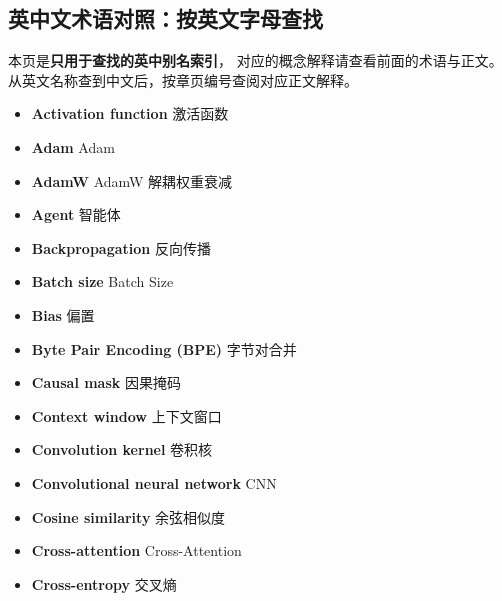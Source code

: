\subsection{英中文术语对照：按英文字母查找}

本页是\textbf{只用于查找的英中别名索引}，
对应的概念解释请查看前面的术语与正文。
从英文名称查到中文后，按章页编号查阅对应正文解释。

\small
\begin{itemize}[leftmargin=1.2em,itemsep=2pt,topsep=3pt]
\item {\sffamily\bfseries Activation function} \quad 激活函数\quad {}
\item {\sffamily\bfseries Adam} \quad Adam\quad {}
\item {\sffamily\bfseries AdamW} \quad AdamW 解耦权重衰减\quad {}
\item {\sffamily\bfseries Agent} \quad 智能体\quad {}
\item {\sffamily\bfseries Backpropagation} \quad 反向传播\quad {}
\item {\sffamily\bfseries Batch size} \quad Batch Size\quad {}
\item {\sffamily\bfseries Bias} \quad 偏置\quad {}
\item {\sffamily\bfseries Byte Pair Encoding (BPE)} \quad 字节对合并\quad {}
\item {\sffamily\bfseries Causal mask} \quad 因果掩码\quad {}
\item {\sffamily\bfseries Context window} \quad 上下文窗口\quad {}
\item {\sffamily\bfseries Convolution kernel} \quad 卷积核\quad {}
\item {\sffamily\bfseries Convolutional neural network} \quad CNN\quad {}
\item {\sffamily\bfseries Cosine similarity} \quad 余弦相似度\quad {}
\item {\sffamily\bfseries Cross-attention} \quad Cross-Attention\quad {}
\item {\sffamily\bfseries Cross-entropy} \quad 交叉熵\quad {}

\end{itemize}
